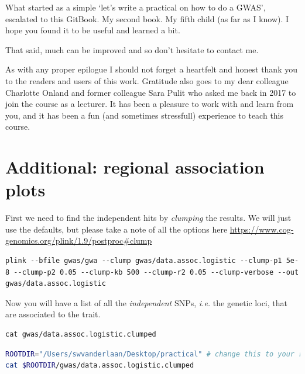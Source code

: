 \documentclass[
]{book}
\begin{document}
What started as a simple `let's write a practical on how to do a GWAS', escalated to this GitBook. My second book. My fifth child (as far as I know). I hope you found it to be useful and learned a bit.

That said, much can be improved and so don't hesitate to contact me.

As with any proper epilogue I should not forget a heartfelt and honest thank you to the readers and users of this work. Gratitude also goes to my dear colleague Charlotte Onland and former colleague Sara Pulit who asked me back in 2017 to join the course as a lecturer. It has been a pleasure to work with and learn from you, and it has been a fun (and sometimes stressfull) experience to teach this course.

\hypertarget{add_chapter_regional_plot}{%
\chapter{Additional: regional association plots}\label{add_chapter_regional_plot}}

First we need to find the independent hits by \emph{clumping} the results. We will just use the defaults, but please take a note of all the options here \url{https://www.cog-genomics.org/plink/1.9/postproc\#clump}

\begin{lstlisting}
plink --bfile gwas/gwa --clump gwas/data.assoc.logistic --clump-p1 5e-8 --clump-p2 0.05 --clump-kb 500 --clump-r2 0.05 --clump-verbose --out gwas/data.assoc.logistic
\end{lstlisting}

Now you will have a list of all the \emph{independent} SNPs, \emph{i.e.} the genetic loci, that are associated to the trait.

\begin{lstlisting}
cat gwas/data.assoc.logistic.clumped
\end{lstlisting}

\begin{lstlisting}[language=bash]
ROOTDIR="/Users/swvanderlaan/Desktop/practical" # change this to your root
cat $ROOTDIR/gwas/data.assoc.logistic.clumped
\end{lstlisting}
\end{document}
